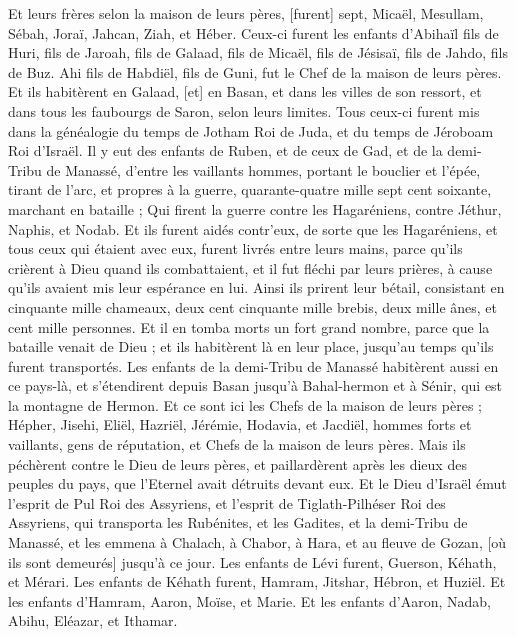 \begin{multicols}{2}
Et leurs frères selon la maison de leurs pères, [furent] sept, Micaël, Mesullam, Sébah, Joraï, Jahcan, Ziah, et Héber.
Ceux-ci furent les enfants d'Abihaïl fils de Huri, fils de Jaroah, fils de Galaad, fils de Micaël, fils de Jésisaï, fils de Jahdo, fils de Buz.
Ahi fils de Habdiël, fils de Guni, fut le Chef de la maison de leurs pères.
Et ils habitèrent en Galaad, [et] en Basan, et dans les villes de son ressort, et dans tous les faubourgs de Saron, selon leurs limites.
Tous ceux-ci furent mis dans la généalogie du temps de Jotham Roi de Juda, et du temps de Jéroboam Roi d'Israël.
Il y eut des enfants de Ruben, et de ceux de Gad, et de la demi-Tribu de Manassé, d'entre les vaillants hommes, portant le bouclier et l'épée, tirant de l'arc, et propres à la guerre, quarante-quatre mille sept cent soixante, marchant en bataille ;
Qui firent la guerre contre les Hagaréniens, contre Jéthur, Naphis, et Nodab.
Et ils furent aidés contr'eux, de sorte que les Hagaréniens, et tous ceux qui étaient avec eux, furent livrés entre leurs mains, parce qu'ils crièrent à Dieu quand ils combattaient, et il fut fléchi par leurs prières, à cause qu'ils avaient mis leur espérance en lui.
Ainsi ils prirent leur bétail, consistant en cinquante mille chameaux, deux cent cinquante mille brebis, deux mille ânes, et cent mille personnes.
Et il en tomba morts un fort grand nombre, parce que la bataille venait de Dieu ; et ils habitèrent là en leur place, jusqu'au temps qu'ils furent transportés.
Les enfants de la demi-Tribu de Manassé habitèrent aussi en ce pays-là, et s'étendirent depuis Basan jusqu'à Bahal-hermon et à Sénir, qui est la montagne de Hermon.
Et ce sont ici les Chefs de la maison de leurs pères ; Hépher, Jisehi, Eliël, Hazriël, Jérémie, Hodavia, et Jacdiël, hommes forts et vaillants, gens de réputation, et Chefs de la maison de leurs pères.
Mais ils péchèrent contre le Dieu de leurs pères, et paillardèrent après les dieux des peuples du pays, que l'Eternel avait détruits devant eux.
Et le Dieu d'Israël émut l'esprit de Pul Roi des Assyriens, et l'esprit de Tiglath-Pilhéser Roi des Assyriens, qui transporta les Rubénites, et les Gadites, et la demi-Tribu de Manassé, et les emmena à Chalach, à Chabor, à Hara, et au fleuve de Gozan, [où ils sont demeurés] jusqu'à ce jour.
\VerseOne{}Les enfants de Lévi furent, Guerson, Kéhath, et Mérari.
Les enfants de Kéhath furent, Hamram, Jitshar, Hébron, et Huziël.
Et les enfants d'Hamram, Aaron, Moïse, et Marie. Et les enfants d'Aaron, Nadab, Abihu, Eléazar, et Ithamar.

\end{multicols}
